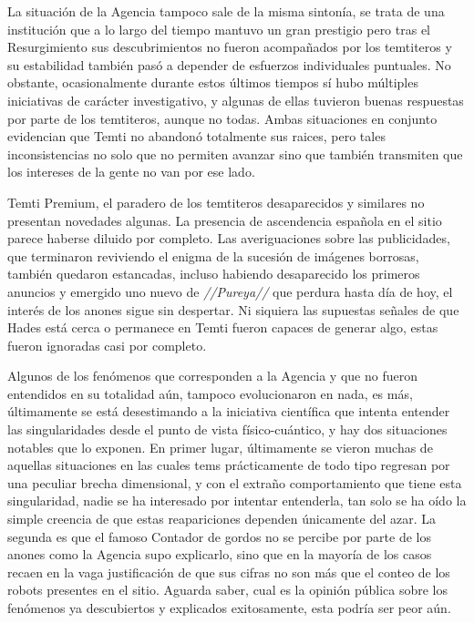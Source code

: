 \documentclass[
  spanish,
]{book}
\begin{document}
La situación de la Agencia tampoco sale de la misma sintonía, se trata de una institución que a lo largo del tiempo mantuvo un gran prestigio pero tras el Resurgimiento sus descubrimientos no fueron acompañados por los temtiteros y su estabilidad también pasó a depender de esfuerzos individuales puntuales. No obstante, ocasionalmente durante estos últimos tiempos sí hubo múltiples iniciativas de carácter investigativo, y algunas de ellas tuvieron buenas respuestas por parte de los temtiteros, aunque no todas.
Ambas situaciones en conjunto evidencian que Temti no abandonó totalmente sus raices, pero tales inconsistencias no solo que no permiten avanzar sino que también transmiten que los intereses de la gente no van por ese lado.

Temti Premium, el paradero de los temtiteros desaparecidos y similares no presentan novedades algunas. La presencia de ascendencia española en el sitio parece haberse diluido por completo.
Las averiguaciones sobre las publicidades, que terminaron reviviendo el enigma de la sucesión de imágenes borrosas, también quedaron estancadas, incluso habiendo desaparecido los primeros anuncios y emergido uno nuevo de \emph{//Pureya//} que perdura hasta día de hoy, el interés de los anones sigue sin despertar. Ni siquiera las supuestas señales de que Hades está cerca o permanece en Temti fueron capaces de generar algo, estas fueron ignoradas casi por completo.

Algunos de los fenómenos que corresponden a la Agencia y que no fueron entendidos en su totalidad aún, tampoco evolucionaron en nada, es más, últimamente se está desestimando a la iniciativa científica que intenta entender las singularidades desde el punto de vista físico-cuántico, y hay dos situaciones notables que lo exponen.
En primer lugar, últimamente se vieron muchas de aquellas situaciones en las cuales tems prácticamente de todo tipo regresan por una peculiar brecha dimensional, y con el extraño comportamiento que tiene esta singularidad, nadie se ha interesado por intentar entenderla, tan solo se ha oído la simple creencia de que estas reapariciones dependen únicamente del azar.
La segunda es que el famoso Contador de gordos no se percibe por parte de los anones como la Agencia supo explicarlo, sino que en la mayoría de los casos recaen en la vaga justificación de que sus cifras no son más que el conteo de los robots presentes en el sitio. Aguarda saber, cual es la opinión pública sobre los fenómenos ya descubiertos y explicados exitosamente, esta podría ser peor aún.
\end{document}
